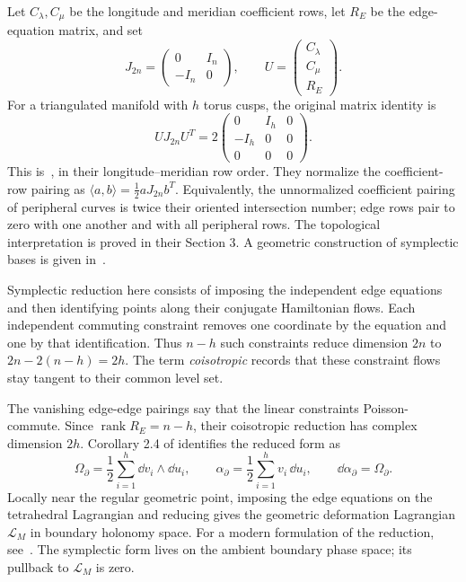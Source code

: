 Let $C_\lambda,C_\mu$ be the longitude and meridian coefficient rows,
let $R_E$ be the edge-equation matrix, and set
\[
 J_{2n}=\begin{pmatrix}0&I_n\\-I_n&0\end{pmatrix},\qquad
 U=\begin{pmatrix}C_\lambda\\C_\mu\\R_E\end{pmatrix}.
\]
For a triangulated manifold with $h$ torus cusps, the original matrix identity is
\begin{equation}
 \boxed{U J_{2n}U^T
 =2\begin{pmatrix}0&I_h&0\\-I_h&0&0\\0&0&0\end{pmatrix}.}
 \label{eq:NZmatrixpairing}
\end{equation}
This is~\cite[Theorem 2.2, equation (21)]{NeumannZagier}, in their
longitude--meridian row order. They normalize the coefficient-row
pairing as $\langle a,b\rangle=\tfrac12aJ_{2n}b^T$.
Equivalently, the unnormalized coefficient pairing of peripheral curves
is twice their oriented intersection number; edge rows pair to zero
with one another and with all peripheral rows. The topological
interpretation is proved in their Section 3. A geometric construction
of symplectic bases is given in~\cite{MathewsPurcellSymplectic}.

Symplectic reduction here consists of imposing the independent
edge equations and then identifying points along their conjugate
Hamiltonian flows. Each independent commuting constraint removes
one coordinate by the equation and one by that identification.
Thus $n-h$ such constraints reduce dimension $2n$ to
$2n-2(n-h)=2h$. The term \emph{coisotropic} records that these
constraint flows stay tangent to their common level set.

The vanishing edge-edge pairings say that the linear constraints
Poisson-commute. Since $\operatorname{rank}R_E=n-h$, their
coisotropic reduction has complex dimension $2h$. Corollary 2.4 of
\cite{NeumannZagier} identifies the reduced form as
\begin{equation}
 \boxed{\Omega_\partial=\frac12\sum_{i=1}^h
                   \dd v_i\wedge\dd u_i,\qquad
 \alpha_\partial=\frac12\sum_{i=1}^h v_i\,\dd u_i,
 \qquad \dd\alpha_\partial=\Omega_\partial.}
 \label{eq:NZboundarysymplectic}
\end{equation}
Locally near the regular geometric point, imposing the edge equations
on the tetrahedral Lagrangian and reducing gives the geometric
deformation Lagrangian $\mathcal L_M$ in boundary holonomy space.
For a modern formulation of the reduction, see~\cite{DimofteVeen}.
The symplectic form lives on the ambient boundary phase space;
its pullback to $\mathcal L_M$ is zero.

